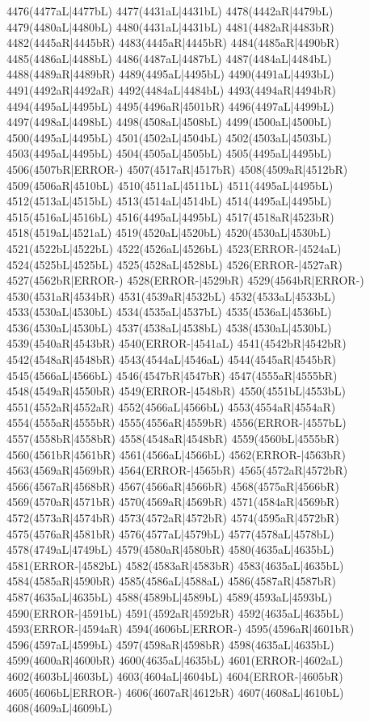 4476(4477aL|4477bL) 4477(4431aL|4431bL) 4478(4442aR|4479bL) 4479(4480aL|4480bL) 4480(4431aL|4431bL) 4481(4482aR|4483bR) \\4482(4445aR|4445bR) 4483(4445aR|4445bR) 4484(4485aR|4490bR) 4485(4486aL|4488bL) 4486(4487aL|4487bL) 4487(4484aL|4484bL) 4488(4489aR|4489bR) 4489(4495aL|4495bL) 4490(4491aL|4493bL) \\4491(4492aR|4492aR) 4492(4484aL|4484bL) 4493(4494aR|4494bR) 4494(4495aL|4495bL) 4495(4496aR|4501bR) 4496(4497aL|4499bL) 4497(4498aL|4498bL) 4498(4508aL|4508bL) 4499(4500aL|4500bL) \\4500(4495aL|4495bL) 4501(4502aL|4504bL) 4502(4503aL|4503bL) 4503(4495aL|4495bL) 4504(4505aL|4505bL) 4505(4495aL|4495bL) 4506(4507bR|ERROR-) 4507(4517aR|4517bR) 4508(4509aR|4512bR) \\4509(4506aR|4510bL) 4510(4511aL|4511bL) 4511(4495aL|4495bL) 4512(4513aL|4515bL) 4513(4514aL|4514bL) 4514(4495aL|4495bL) 4515(4516aL|4516bL) 4516(4495aL|4495bL) 4517(4518aR|4523bR) \\4518(4519aL|4521aL) 4519(4520aL|4520bL) 4520(4530aL|4530bL) 4521(4522bL|4522bL) 4522(4526aL|4526bL) 4523(ERROR-|4524aL) 4524(4525bL|4525bL) 4525(4528aL|4528bL) 4526(ERROR-|4527aR) \\4527(4562bR|ERROR-) 4528(ERROR-|4529bR) 4529(4564bR|ERROR-) 4530(4531aR|4534bR) 4531(4539aR|4532bL) 4532(4533aL|4533bL) 4533(4530aL|4530bL) 4534(4535aL|4537bL) 4535(4536aL|4536bL) \\4536(4530aL|4530bL) 4537(4538aL|4538bL) 4538(4530aL|4530bL) 4539(4540aR|4543bR) 4540(ERROR-|4541aL) 4541(4542bR|4542bR) 4542(4548aR|4548bR) 4543(4544aL|4546aL) 4544(4545aR|4545bR) \\4545(4566aL|4566bL) 4546(4547bR|4547bR) 4547(4555aR|4555bR) 4548(4549aR|4550bR) 4549(ERROR-|4548bR) 4550(4551bL|4553bL) 4551(4552aR|4552aR) 4552(4566aL|4566bL) 4553(4554aR|4554aR) \\4554(4555aR|4555bR) 4555(4556aR|4559bR) 4556(ERROR-|4557bL) 4557(4558bR|4558bR) 4558(4548aR|4548bR) 4559(4560bL|4555bR) 4560(4561bR|4561bR) 4561(4566aL|4566bL) 4562(ERROR-|4563bR) \\4563(4569aR|4569bR) 4564(ERROR-|4565bR) 4565(4572aR|4572bR) 4566(4567aR|4568bR) 4567(4566aR|4566bR) 4568(4575aR|4566bR) 4569(4570aR|4571bR) 4570(4569aR|4569bR) 4571(4584aR|4569bR) \\4572(4573aR|4574bR) 4573(4572aR|4572bR) 4574(4595aR|4572bR) 4575(4576aR|4581bR) 4576(4577aL|4579bL) 4577(4578aL|4578bL) 4578(4749aL|4749bL) 4579(4580aR|4580bR) 4580(4635aL|4635bL) \\4581(ERROR-|4582bL) 4582(4583aR|4583bR) 4583(4635aL|4635bL) 4584(4585aR|4590bR) 4585(4586aL|4588aL) 4586(4587aR|4587bR) 4587(4635aL|4635bL) 4588(4589bL|4589bL) 4589(4593aL|4593bL) \\4590(ERROR-|4591bL) 4591(4592aR|4592bR) 4592(4635aL|4635bL) 4593(ERROR-|4594aR) 4594(4606bL|ERROR-) 4595(4596aR|4601bR) 4596(4597aL|4599bL) 4597(4598aR|4598bR) 4598(4635aL|4635bL) \\4599(4600aR|4600bR) 4600(4635aL|4635bL) 4601(ERROR-|4602aL) 4602(4603bL|4603bL) 4603(4604aL|4604bL) 4604(ERROR-|4605bR) 4605(4606bL|ERROR-) 4606(4607aR|4612bR) 4607(4608aL|4610bL) \\4608(4609aL|4609bL) 